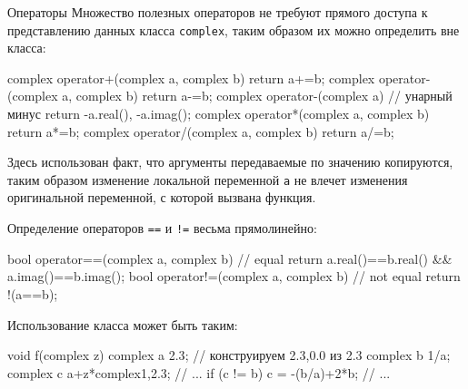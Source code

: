 \documentclass[
    9pt,
    hyperref={pdfencoding=unicode}
    ]{beamer}
\theoremstyle{definition}
\begin{document}
\begin{frame}[fragile]{Операторы}
    Множество полезных операторов не требуют прямого доступа к представлению данных класса \texttt{complex}, таким образом их можно определить вне класса:
    
    \vfill
    
    \begin{cppcode}
        complex operator+(complex a, complex b) 
        { return a+=b; }
        complex operator-(complex a, complex b) 
        { return a-=b; }
        complex operator-(complex a) // унарный минус
        { return {-a.real(), -a.imag()}; } 
        complex operator*(complex a, complex b) 
        { return a*=b; }
        complex operator/(complex a, complex b) 
        { return a/=b; }
    \end{cppcode}

    \vfill
    
    Здесь использован факт, что аргументы передаваемые по значению копируются, 
    таким образом изменение локальной переменной \texttt{a} не влечет изменения оригинальной переменной, с которой вызвана функция.

\end{frame}
  
    
\begin{frame}[fragile]
   Определение операторов \texttt{==} и \texttt{!=} весьма прямолинейно:
   \begin{cppcode}
       bool operator==(complex a, complex b) // equal
       {
           return a.real()==b.real() && a.imag()==b.imag();
       }
       bool operator!=(complex a, complex b) // not equal
       {
           return !(a==b);
       }
   \end{cppcode} 
\end{frame}

\begin{frame}[fragile]
    Использование класса может быть таким:
    \begin{cppcode}
        void f(complex z)
        {
            complex a {2.3}; // конструируем {2.3,0.0} из 2.3
            complex b {1/a};
            complex c {a+z*complex{1,2.3}};
            // ...
            if (c != b)
                c = -(b/a)+2*b;
            // ...
        }
        
    \end{cppcode} 
\end{frame}
\end{document}
